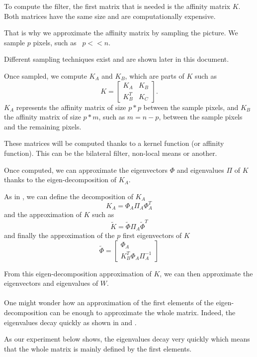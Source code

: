 \documentclass[]{article}
\begin{document}
To compute the filter, the first matrix that is needed is the affinity matrix \(K\).
Both matrices have the same size and are computationally expensive.

That is why we approximate the affinity matrix by sampling the picture.
We sample \(p\) pixels, such as  \(p << n\).

Different sampling techniques exist and are shown later in this document. %

Once sampled, we compute \(K_A\) and \(K_B\), which are parts of \(K\) such as
\[
 K = \begin{bmatrix}
  K_A & K_B \\
  K_B^T & K_C
 \end{bmatrix}.
\]
\(K_A\) represents the affinity matrix of size \(p*p\) between the sample pixels, and \(K_B\) the affinity matrix of size \(p*m\), such as \(m = n-p\), between the sample pixels and the remaining pixels.

These matrices will be computed thanks to a kernel function (or affinity function). This can be the bilateral filter, non-local means or another.

Once computed, we can approximate the eigenvectors \(\Phi\) and eigenvalues \(\Pi\) of \(K\) thanks to the eigen-decomposition of \(K_A\).

As in \cite{glide_2014}, we can define the decomposition of \(K_A\)
\[K_A = \Phi_A \Pi_A \Phi_A^T\]
and the approximation of \(K\) such as
\[\tilde{K} = \tilde{\Phi} \Pi_A \tilde{\Phi}^T\]
and finally the approximation of the \(p\) first eigenvectors of \(K\)
\[
 \tilde{\Phi} = \begin{bmatrix}
  \Phi_A \\
  K_B^T \Phi_A \Pi_A^{-1}
 \end{bmatrix}
\]

From this eigen-decomposition approximation of \(K\), we can then approximate the eigenvectors and eigenvalues of \(W\).

\paragraph{}
One might wonder how an approximation of the first elements of the eigen-decomposition can be enough to approximate the whole matrix.
Indeed, the eigenvalues decay quickly as shown in \cite{siam_slides_2016} and \cite{meyer_perturbation_2014}.

As our experiment below shows, the eigenvalues decay very quickly which means that the whole matrix is mainly defined by the first elements.
\end{document}
